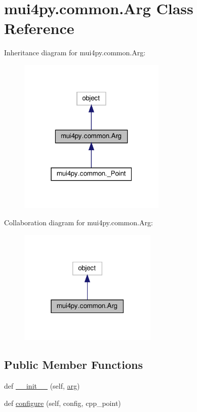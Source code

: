 \hypertarget{classmui4py_1_1common_1_1_arg}{}\section{mui4py.\+common.\+Arg Class Reference}
\label{classmui4py_1_1common_1_1_arg}


Inheritance diagram for mui4py.\+common.\+Arg\+:
\nopagebreak
\begin{figure}[H]
\begin{center}
\leavevmode
\includegraphics[width=199pt]{classmui4py_1_1common_1_1_arg__inherit__graph}
\end{center}
\end{figure}


Collaboration diagram for mui4py.\+common.\+Arg\+:
\nopagebreak
\begin{figure}[H]
\begin{center}
\leavevmode
\includegraphics[width=187pt]{classmui4py_1_1common_1_1_arg__coll__graph}
\end{center}
\end{figure}
\subsection*{Public Member Functions}
\begin{DoxyCompactItemize}
\item 
def \hyperlink{classmui4py_1_1common_1_1_arg_a2eaf791d82b8a8663316ede9133432d5}{\+\_\+\+\_\+init\+\_\+\+\_\+} (self, \hyperlink{classmui4py_1_1common_1_1_arg_a45ebd7fb8f9080eb469557f4e77e6f0c}{arg})
\item 
def \hyperlink{classmui4py_1_1common_1_1_arg_a045ba65aadaa1d6f9c5dd669dd9fef81}{configure} (self, config, cpp\+\_\+point)
\end{DoxyCompactItemize}
